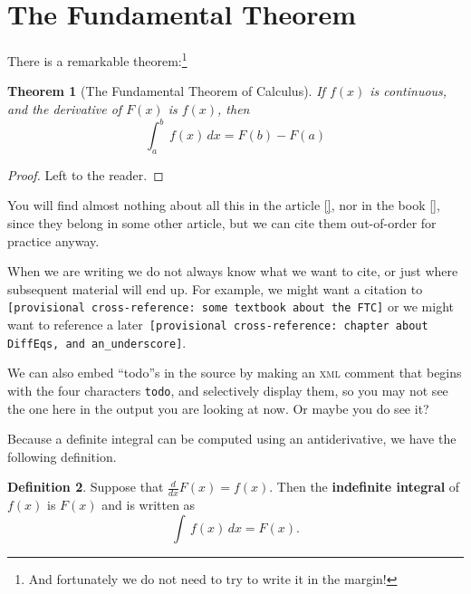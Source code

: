 \documentclass{amsart}
\theoremstyle{plain}%
\newtheorem{theorem}{Theorem}[section]
\theoremstyle{definition}%
\newtheorem{definition}[theorem]{Definition}
\theoremstyle{remark}%
\newcommand{\xreffont}{\relax}
\newcommand{\mono}[1]{\texttt{#1}}
\newcommand{\initialism}[1]{\textsc{\MakeLowercase{#1}}}
\newcommand{\terminology}[1]{\textbf{#1}}
\numberwithin{equation}{section}
\newcommand{\definiteintegral}[4]{\int_{#1}^{#2}\,#3\,d#4}
\begin{document}
\section{The Fundamental Theorem}\label{section-fundamental-theorem}%
There is a remarkable theorem:\footnote{And fortunately we do not need to try to write it in the margin!\label{footnote-fermat}}%
\begin{theorem}[The Fundamental Theorem of Calculus]\label{theorem-FTC}%
%
%
If \(f(x)\) is continuous, and the derivative of \(F(x)\) is \(f(x)\), then%
\begin{equation*}
\definiteintegral{a}{b}{f(x)}{x}=F(b)-F(a)
\end{equation*}
%
\end{theorem}
\begin{proof}\label{theorem-FTC-4}%
Left to the reader.%
\end{proof}
You will find almost nothing about all this in the article \hyperlink{biblio-lay-article}{[{\xreffont 2}]}, nor in the book \hyperlink{biblio-judson-AATA}{[{\xreffont 1}]}, since they belong in some other article, but we can cite them out-of-order for practice anyway.%
\par
When we are writing we do not always know what we want to cite, or just where subsequent material will end up.  For example, we might want a citation to \mono{[provisional cross-reference: some textbook about the FTC]} or we might want to reference a later~\mono{[provisional cross-reference: chapter about DiffEq\textquotesingle{}s, and an\_underscore]}.%
\par
We can also embed ``todo''s in the source by making an \initialism{XML} comment that begins with the four characters \mono{todo}, and selectively display them, so you may not see the one here in the output you are looking at now.  Or maybe you do see it?%
\par
Because a definite integral can be computed using an antiderivative, we have the following definition.%
\begin{definition}\label{definition-indefinite-integral}%
%
%
%
\label{definition-indefinite-integral-3}%
Suppose that \(\frac{d}{dx}F(x)=f(x)\).  Then the \terminology{indefinite integral} of \(f(x)\) is \(F(x)\) and is written as%
\begin{equation*}
\int\,f(x)\,dx=F(x)\text{.}
\end{equation*}
%
\end{definition}
%
%
\typeout{************************************************}
\typeout{************************************************}
%
\end{document}
